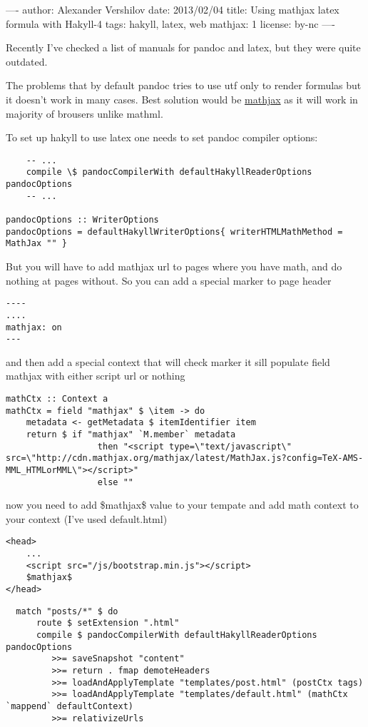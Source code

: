 ----
author: Alexander Vershilov
date: 2013/02/04
title: Using mathjax latex formula with Hakyll-4
tags: hakyll, latex, web
mathjax: 1
license: by-nc
----

Recently I've checked a list of manuals for pandoc and latex, but they
were quite outdated.

The problems that by default pandoc tries to use utf only to render
formulas but it doesn't work in many cases. Best solution would be
\href{http://www.mathjax.org/}{mathjax} as it will work in majority of
brousers unlike mathml.

To set up hakyll to use latex one needs to set pandoc compiler options:

\begin{verbatim}
    -- ...
    compile \$ pandocCompilerWith defaultHakyllReaderOptions pandocOptions 
    -- ...

pandocOptions :: WriterOptions
pandocOptions = defaultHakyllWriterOptions{ writerHTMLMathMethod = MathJax "" }
\end{verbatim}

But you will have to add mathjax url to pages where you have math, and do
nothing at pages without. So you can add a special marker to page 
header

\begin{verbatim}
----
....
mathjax: on
---
\end{verbatim}

and then add a special context that will check marker it sill populate field
mathjax with either script url or nothing

\begin{verbatim}
mathCtx :: Context a
mathCtx = field "mathjax" $ \item -> do
    metadata <- getMetadata $ itemIdentifier item
    return $ if "mathjax" `M.member` metadata
                  then "<script type=\"text/javascript\" src=\"http://cdn.mathjax.org/mathjax/latest/MathJax.js?config=TeX-AMS-MML_HTMLorMML\"></script>"
                  else ""
\end{verbatim}

now you need to add \$mathjax\$ value to your tempate and add math context to
your context (I've used default.html)

\begin{verbatim}
<head>
    ...
    <script src="/js/bootstrap.min.js"></script>
    $mathjax$
</head>
\end{verbatim}

\begin{verbatim}
  match "posts/*" $ do
      route $ setExtension ".html"
      compile $ pandocCompilerWith defaultHakyllReaderOptions pandocOptions 
         >>= saveSnapshot "content"
         >>= return . fmap demoteHeaders
         >>= loadAndApplyTemplate "templates/post.html" (postCtx tags)
         >>= loadAndApplyTemplate "templates/default.html" (mathCtx `mappend` defaultContext)
         >>= relativizeUrls
\end{verbatim}

